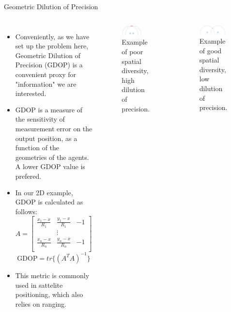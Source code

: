\documentclass[9pt]{beamer}
\begin{document}
\begin{frame}[t]{Geometric Dilution of Precision}

\small
\begin{columns}

\begin{itemize}
  \item Conveniently, as we have set up the problem here, Geometric Dilution of Precision (GDOP) is a convenient proxy for "information" we are interested.
  \item GDOP is a measure of the sensitivity of measurement error on the output position, as a function of the geometries of the agents. A lower GDOP value is prefered.
  \item In our 2D example, GDOP is calculated as follows:
  \[ A = \begin{bmatrix} \frac{x_1 - x}{R_1}& \frac{y_1 - x}{R_1} & -1\\ &\vdots \\  \frac{x_n - x}{R_n} & \frac{y_n - x}{R_n} & -1\\ \end{bmatrix} \]
  \[ \text{GDOP}  = tr\{ (A^T A)^{-1} \}\]
  \item This metric is commonly used in sattelite positioning, which also relies on ranging.
\end{itemize}


\begin{figure}
\includegraphics[width=0.7\textwidth,right]{img/bad_gdop.png}
\caption{Example of poor spatial diversity, high dilution of precision.}
\end{figure}
\begin{figure}
\includegraphics[width=0.9\textwidth,right]{img/good_gdop.png}
\caption{Example of good spatial diversity, low dilution of precision.}
\end{figure}
\end{columns}

\end{frame}
\end{document}
